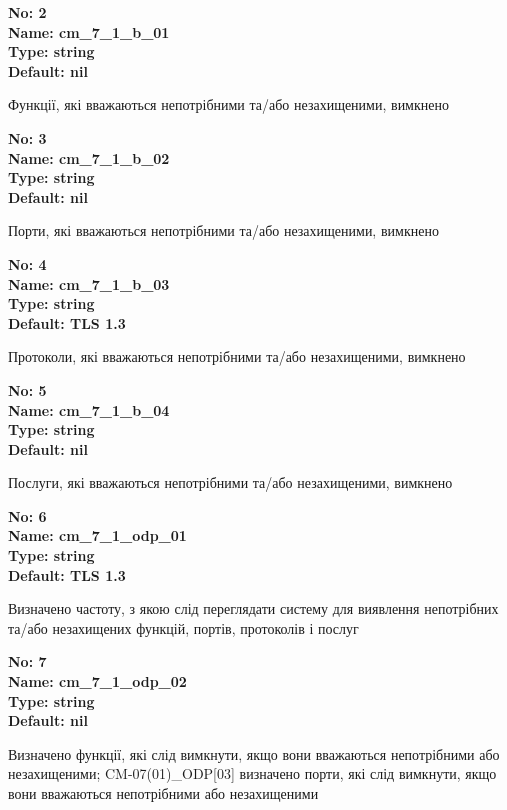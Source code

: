 \documentclass{article}
\begin{document}
{\footnotesize\bfseries
No: 2\\
Name: cm\_\allowbreak{}7\_\allowbreak{}1\_\allowbreak{}b\_\allowbreak{}01\\
Type: string\\
Default: nil
}

{\footnotesize Функції, які вважаються непотрібними та/або незахищеними, вимкнено}


{\footnotesize\bfseries
No: 3\\
Name: cm\_\allowbreak{}7\_\allowbreak{}1\_\allowbreak{}b\_\allowbreak{}02\\
Type: string\\
Default: nil
}

{\footnotesize Порти, які вважаються непотрібними та/або незахищеними, вимкнено}


{\footnotesize\bfseries
No: 4\\
Name: cm\_\allowbreak{}7\_\allowbreak{}1\_\allowbreak{}b\_\allowbreak{}03\\
Type: string\\
Default: \textquotedbl{}TLS 1.3\textquotedbl{}
}

{\footnotesize Протоколи, які вважаються непотрібними та/або незахищеними, вимкнено}


{\footnotesize\bfseries
No: 5\\
Name: cm\_\allowbreak{}7\_\allowbreak{}1\_\allowbreak{}b\_\allowbreak{}04\\
Type: string\\
Default: nil
}

{\footnotesize Послуги, які вважаються непотрібними та/або незахищеними, вимкнено}


{\footnotesize\bfseries
No: 6\\
Name: cm\_\allowbreak{}7\_\allowbreak{}1\_\allowbreak{}odp\_\allowbreak{}01\\
Type: string\\
Default: \textquotedbl{}TLS 1.3\textquotedbl{}
}

{\footnotesize Визначено частоту, з якою слід переглядати систему для виявлення непотрібних та/або незахищених функцій, портів, протоколів і послуг}


{\footnotesize\bfseries
No: 7\\
Name: cm\_\allowbreak{}7\_\allowbreak{}1\_\allowbreak{}odp\_\allowbreak{}02\\
Type: string\\
Default: nil
}

{\footnotesize Визначено функції, які слід вимкнути, якщо вони вважаються непотрібними або незахищеними; CM-07(01)\_\allowbreak{}ODP[03] визначено порти, які слід вимкнути, якщо вони вважаються непотрібними або незахищеними}
\end{document}
